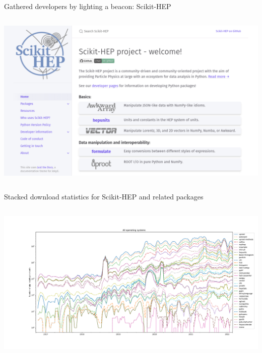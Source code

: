 \documentclass[aspectratio=169]{beamer}
\begin{document}
\begin{frame}{Gathered developers by lighting a beacon: Scikit-HEP}
\vspace{0.18 cm}
\begin{columns}
\includegraphics[width=\linewidth]{scikit-hep-webpage.png}
\end{columns}
\end{frame}

\begin{frame}{Stacked download statistics for Scikit-HEP and related packages}
\begin{columns}
\includegraphics[width=\linewidth]{pip-allos-scikithep-log.pdf}
\end{columns}
\end{frame}
\end{document}
